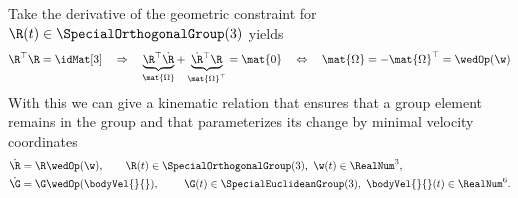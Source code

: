 Take the derivative of the geometric constraint for $\R(t) \in \SpecialOrthogonalGroup(3)$ yields
\begin{align}
 \R^\top \R = \idMat[3]
\quad \Rightarrow \quad
 \underbrace{\R^\top \dot{\R}}_{\mat{\Omega}} + \underbrace{\dot{\R}\vphantom{\R}^\top \R}_{\mat{\Omega}^\top} = \mat{0}
\quad \Leftrightarrow \quad
 \mat{\Omega} = -\mat{\Omega}^\top = \wedOp(\w)
\end{align}
With this we can give a kinematic relation that ensures that a group element remains in the group and that parameterizes its change by minimal velocity coordinates
\begin{subequations}
\begin{align}
 \dot{\R} &= \R \wedOp(\w), \qquad \R(t) \in \SpecialOrthogonalGroup(3), \ \w(t) \in \RealNum^3,
\\
 \dot{\G} &= \G \wedOp(\bodyVel{}{}), \qquad \ \G(t) \in \SpecialEuclideanGroup(3), \ \bodyVel{}{}(t) \in \RealNum^6.
\end{align}
\end{subequations}

